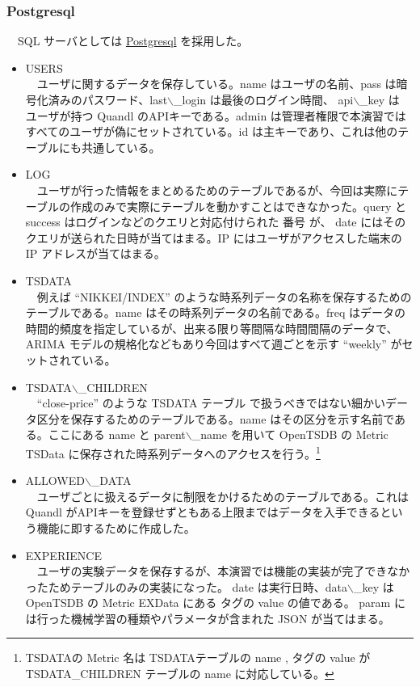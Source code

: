 \documentclass[dvipdfmx]{scrartcl}
\begin{document}
\subsubsection{Postgresql}
\label{sec:org11a0ed2}
　SQL サーバとしては \href{https://www.postgresql.org/}{Postgresql} を採用した。\\
\begin{itemize}
\item USERS\\
　ユーザに関するデータを保存している。name はユーザの名前、pass は暗号化済みのパスワード、last$\backslash$\_login は最後のログイン時間、 api$\backslash$\_key は ユーザが持つ Quandl のAPIキーである。admin は管理者権限で本演習ではすべてのユーザが偽にセットされている。id は主キーであり、これは他のテーブルにも共通している。\\
\item LOG\\
　ユーザが行った情報をまとめるためのテーブルであるが、今回は実際にテーブルの作成のみで実際にテーブルを動かすことはできなかった。query と success はログインなどのクエリと対応付けられた 番号 が、 date にはそのクエリが送られた日時が当てはまる。IP にはユーザがアクセスした端末の IP アドレスが当てはまる。\\
\item TSDATA\\
　例えば ``NIKKEI/INDEX'' のような時系列データの名称を保存するためのテーブルである。name はその時系列データの名前である。freq はデータの時間的頻度を指定しているが、出来る限り等間隔な時間間隔のデータで、ARIMA モデルの規格化などもあり今回はすべて週ごとを示す ``weekly'' がセットされている。\\
\item TSDATA$\backslash$\_CHILDREN\\
　``close-price'' のような TSDATA テーブル で扱うべきではない細かいデータ区分を保存するためのテーブルである。name はその区分を示す名前である。ここにある name と parent$\backslash$\_name を用いて OpenTSDB の Metric TSData に保存された時系列データへのアクセスを行う。\footnote{TSDATAの Metric 名は TSDATAテーブルの name , タグの value が TSDATA\_CHILDREN テーブルの name に対応している。}\\
\item ALLOWED$\backslash$\_DATA\\
　ユーザごとに扱えるデータに制限をかけるためのテーブルである。これは Quandl がAPIキーを登録せずともある上限まではデータを入手できるという機能に即するために作成した。\\
\item EXPERIENCE\\
　ユーザの実験データを保存するが、本演習では機能の実装が完了できなかったためテーブルのみの実装になった。 date は実行日時、data$\backslash$\_key は OpenTSDB の Metric EXData にある タグの value の値である。 param には行った機械学習の種類やパラメータが含まれた JSON が当てはまる。\\
\end{itemize}
\end{document}

